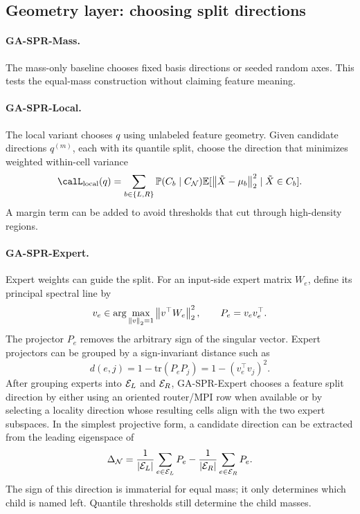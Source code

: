\documentclass{article}
\begin{document}
\subsection{Geometry layer: choosing split directions}

\paragraph{GA-SPR-Mass.}
The mass-only baseline chooses fixed basis directions or seeded random axes.
This tests the equal-mass construction without claiming feature meaning.

\paragraph{GA-SPR-Local.}
The local variant chooses $q$ using unlabeled feature geometry.  Given candidate
directions $q^{(m)}$, each with its quantile split, choose the direction that
minimizes weighted within-cell variance
\begin{equation}
  \calL_{\mathrm{local}}(q)=\sum_{b\in\{L,R\}}\Prob(C_b\mid C_{\calN})
  \E[\norm{\tilde X-\mu_b}_2^2\mid \tilde X\in C_b].
\end{equation}
A margin term can be added to avoid thresholds that cut through high-density
regions.

\paragraph{GA-SPR-Expert.}
Expert weights can guide the split.  For an input-side expert matrix $W_e$,
define its principal spectral line by
\begin{equation}
  v_e\in\arg\max_{\left\lVert v \right\rVert_2=1}\left\lVert v^{\top}W_e \right\rVert_2^2,\qquad
  P_e=v_ev_e^{\top}.
\end{equation}
The projector $P_e$ removes the arbitrary sign of the singular vector.  Expert
projectors can be grouped by a sign-invariant distance such as
\begin{equation}
  d(e,j)=1-\mathrm{tr}(P_eP_j)=1-(v_e^{\top}v_j)^2.
\end{equation}
After grouping experts into $\mathcal{E}_L$ and $\mathcal{E}_R$, GA-SPR-Expert chooses a
feature split direction by either using an oriented router/MPI row when available
or by selecting a locality direction whose resulting cells align with the two
expert subspaces.  In the simplest projective form, a candidate direction can be
extracted from the leading eigenspace of
\begin{equation}
  \Delta_{\mathcal{N}}=\frac{1}{|\mathcal{E}_L|}\sum_{e\in\mathcal{E}_L}P_e
  -\frac{1}{|\mathcal{E}_R|}\sum_{e\in\mathcal{E}_R}P_e.
\end{equation}
The sign of this direction is immaterial for equal mass; it only determines
which child is named left.  Quantile thresholds still determine the child masses.
\end{document}
